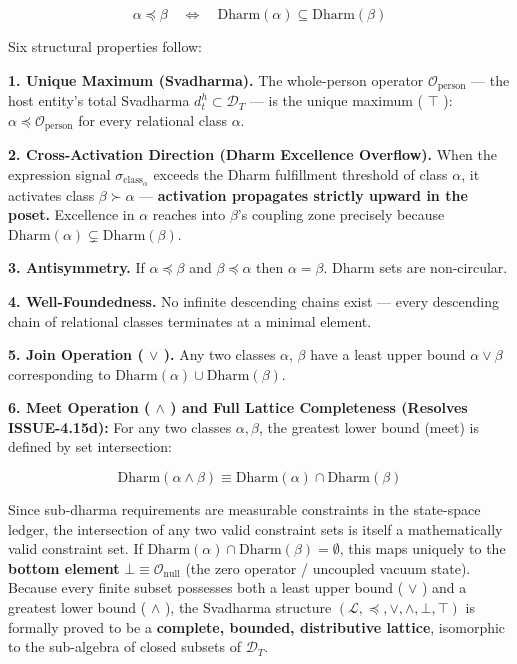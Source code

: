 \documentclass[11pt,a4paper]{article}
\theoremstyle{definition}
\theoremstyle{remark}
\begin{document}
\begin{equation}
\alpha \preceq \beta \quad \iff \quad \text{Dharm}(\alpha) \subseteq \text{Dharm}(\beta)
\end{equation}


Six structural properties follow:

\textbf{1. Unique Maximum (Svadharma).} The whole-person operator $\mathcal{O}_{\text{person}}$ — the host entity's total Svadharma $d_t^h \subset \mathcal{D}_T$ — is the unique maximum ( $\top$ ): $\alpha \preceq \mathcal{O}_{\text{person}}$ for every relational class $\alpha$.

\textbf{2. Cross-Activation Direction (Dharm Excellence Overflow).} When the expression signal $\sigma_{\text{class}_\alpha}$ exceeds the Dharm fulfillment threshold of class $\alpha$, it activates class $\beta \succ \alpha$ — \textbf{activation propagates strictly upward in the poset.} Excellence in $\alpha$ reaches into $\beta$'s coupling zone precisely because $\text{Dharm}(\alpha) \subsetneq \text{Dharm}(\beta)$.

\textbf{3. Antisymmetry.} If $\alpha \preceq \beta$ and $\beta \preceq \alpha$ then $\alpha = \beta$. Dharm sets are non-circular.

\textbf{4. Well-Foundedness.} No infinite descending chains exist — every descending chain of relational classes terminates at a minimal element.

\textbf{5. Join Operation ( $\vee$ ).} Any two classes $\alpha$, $\beta$ have a least upper bound $\alpha \vee \beta$ corresponding to $\text{Dharm}(\alpha) \cup \text{Dharm}(\beta)$.

\textbf{6. Meet Operation ( $\wedge$ ) and Full Lattice Completeness (Resolves ISSUE-4.15d):} For any two classes $\alpha, \beta$, the greatest lower bound (meet) is defined by set intersection:


\begin{equation}
\text{Dharm}(\alpha \wedge \beta) \equiv \text{Dharm}(\alpha) \cap \text{Dharm}(\beta)
\end{equation}


Since sub-dharma requirements are measurable constraints in the state-space ledger, the intersection of any two valid constraint sets is itself a mathematically valid constraint set. If $\text{Dharm}(\alpha) \cap \text{Dharm}(\beta) = \emptyset$, this maps uniquely to the \textbf{bottom element} $\bot \equiv \mathcal{O}_{\text{null}}$ (the zero operator / uncoupled vacuum state). Because every finite subset possesses both a least upper bound ( $\vee$ ) and a greatest lower bound ( $\wedge$ ), the Svadharma structure $(\mathcal{L}, \preceq, \vee, \wedge, \bot, \top)$ is formally proved to be a \textbf{complete, bounded, distributive lattice}, isomorphic to the sub-algebra of closed subsets of $\mathcal{D}_T$.
\end{document}
